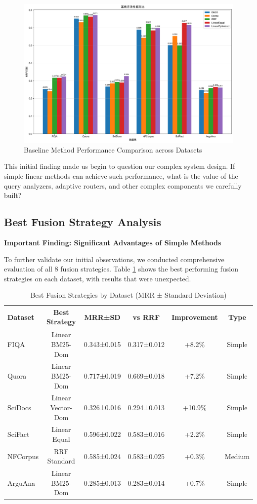 \documentclass[letterpaper]{article} %
\begin{document}
\begin{figure}[t]
\centering
\includegraphics[width=0.8\columnwidth]{charts/baseline_comparison.png}
\caption{Baseline Method Performance Comparison across Datasets}
\label{fig:baseline}
\end{figure}

This initial finding made us begin to question our complex system design. If simple linear methods can achieve such performance, what is the value of the query analyzers, adaptive routers, and other complex components we carefully built?

\subsection{Best Fusion Strategy Analysis}

\textbf{Important Finding: Significant Advantages of Simple Methods}

To further validate our initial observations, we conducted comprehensive evaluation of all 8 fusion strategies. Table \ref{tab:best_strategies} shows the best performing fusion strategies on each dataset, with results that were unexpected.

\begin{table}[t]
\centering
\caption{Best Fusion Strategies by Dataset (MRR ± Standard Deviation)}
\label{tab:best_strategies}
\begin{tabular}{lccccc}
\toprule
Dataset & Best Strategy & MRR±SD & vs RRF & Improvement & Type \\
\midrule
FIQA & Linear BM25-Dom & 0.343±0.015 & 0.317±0.012 & +8.2\% & Simple \\
Quora & Linear BM25-Dom & 0.717±0.019 & 0.669±0.018 & +7.2\% & Simple \\
SciDocs & Linear Vector-Dom & 0.326±0.016 & 0.294±0.013 & +10.9\% & Simple \\
SciFact & Linear Equal & 0.596±0.022 & 0.583±0.016 & +2.2\% & Simple \\
NFCorpus & RRF Standard & 0.585±0.024 & 0.583±0.025 & +0.3\% & Medium \\
ArguAna & Linear BM25-Dom & 0.285±0.013 & 0.283±0.014 & +0.7\% & Simple \\
\bottomrule
\end{tabular}
\end{table}
\end{document}
